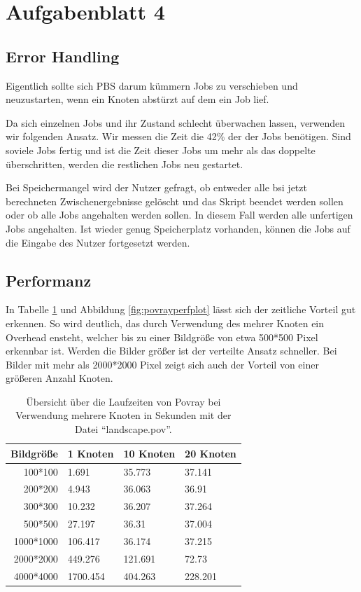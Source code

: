 \section{Aufgabenblatt 4}

\subsection{Error Handling}
	Eigentlich sollte sich PBS darum kümmern Jobs zu verschieben und 
	neuzustarten, wenn ein Knoten abstürzt auf dem ein Job lief.

	Da sich einzelnen Jobs und ihr Zustand schlecht überwachen lassen,
	verwenden wir folgenden Ansatz.
	Wir messen die Zeit die 42\% der der Jobs benötigen.
	Sind soviele Jobs fertig und ist die Zeit dieser Jobs um mehr als das
	doppelte überschritten, werden die restlichen Jobs neu gestartet.

	Bei Speichermangel wird der Nutzer gefragt,
	ob entweder alle bsi jetzt berechneten Zwischenergebnisse gelöscht und
	das Skript beendet werden sollen oder ob alle Jobs angehalten werden sollen.
	In diesem Fall werden alle unfertigen Jobs angehalten.
	Ist wieder genug Speicherplatz vorhanden,
	können die Jobs auf die Eingabe des Nutzer fortgesetzt werden.


\subsection{Performanz}

In Tabelle \ref{tab:povrayperformance}  und Abbildung \ref{fig:povrayperfplot} lässt sich der zeitliche Vorteil gut erkennen. 
		So wird deutlich, das durch Verwendung des mehrer Knoten ein Overhead ensteht,
		welcher bis zu einer Bildgröße von etwa 500*500 Pixel erkennbar ist.
		Werden die Bilder größer ist der verteilte Ansatz schneller.
		Bei Bilder mit mehr als 2000*2000 Pixel zeigt sich auch der Vorteil von einer größeren Anzahl Knoten.
	
		\begin{table}[h]
		\begin{center}
		\begin{tabular}{r l l l} 
			\toprule
			Bildgröße	&	1 Knoten		&	10 Knoten	&	20 Knoten	\\
			\midrule
			100*100		&	1.691		&	35.773	&	37.141	\\
			200*200		&	4.943		&	36.063	&	36.91	\\
			300*300		&	10.232	&	36.207	&	37.264	\\
			500*500		&	27.197	&	36.31		&	37.004	\\
			1000*1000	&	106.417	&	36.174	&	37.215	\\
			2000*2000	&	449.276	&	121.691	&	72.73	\\
			4000*4000	&	1700.454	&	404.263	&	228.201	\\
			\bottomrule
		\end{tabular}
		\caption{Übersicht über die Laufzeiten von Povray bei Verwendung mehrere Knoten in Sekunden mit der Datei ``landscape.pov''.}
		\label{tab:povrayperformance}
		\end{center}
		\end{table}
	
